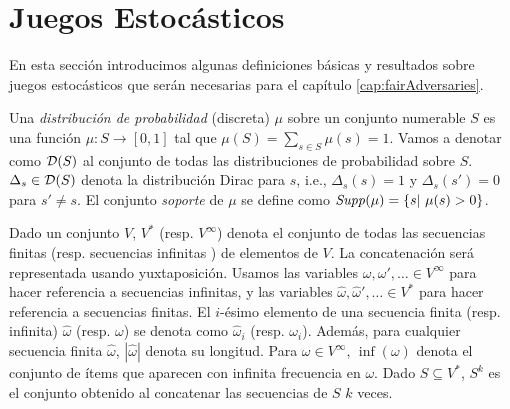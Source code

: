 \section{Juegos Estocásticos}

En esta sección introducimos algunas definiciones básicas y resultados sobre juegos estocásticos que serán necesarias para el capítulo \ref{cap:fairAdversaries}.

Una \emph{distribución de probabilidad} (discreta) $\mu$ sobre un conjunto numerable $S$ es una función $\mu: S \rightarrow [0, 1] $  tal que 
$\mu(S) = \sum_{s \in S} \mu(s) = 1$. 
Vamos a denotar como $\mathcal{D}(S)$ al conjunto de todas las distribuciones de probabilidad sobre $S$. $\Delta_s \in \mathcal{D}(S)$ denota la distribución Dirac para $s$, i.e., 
$\Delta_s(s) =1$ y $\Delta_s(s') = 0$ para $s'\neq s$.
El conjunto \textit{soporte} de $\mu$ se define como $\mathit{Supp}(\mu) = \{s |~\mu (s) > 0\}$.

Dado un conjunto $V$, $V^*$ (resp. $V^\infty$) denota el conjunto de todas las secuencias finitas (resp. secuencias infinitas ) de elementos de $V$. La concatenación será representada usando yuxtaposición. Usamos las variables $\omega, \omega', \dots \in V^\infty$ para hacer referencia a secuencias infinitas, y las variables $\hat{\omega}, \hat{\omega}', \dots \in V^*$ para hacer referencia a secuencias finitas. El $i$-ésimo elemento de una secuencia finita (resp. infinita) $\hat{\omega}$ (resp. $\omega$) se denota como
$\hat{\omega}_i$ (resp. $\omega_i$). Además, para cualquier secuencia finita $\hat{\omega}$, $|\hat{\omega}|$ denota su longitud. Para $\omega \in V^\infty$, $\inf(\omega)$ denota el conjunto de ítems que aparecen con infinita frecuencia en $\omega$. Dado
$S \subseteq V^*$, $S^k$ es el conjunto obtenido al concatenar las secuencias de $S$ $k$ veces.
	 
